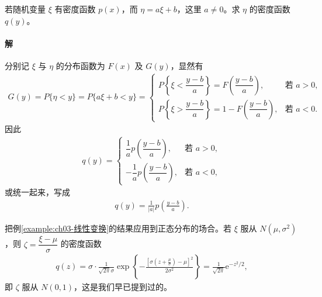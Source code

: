 \documentclass[../../main.tex]{subfiles}
\begin{document}
\begin{example}[线性变换]\label{example:ch03-线性变换}
若随机变量 $\xi$ 有密度函数 $p(x)$，而 $\eta=a\xi+b$，这里 $a\neq 0$。求 $\eta$ 的密度函数 $q(y)$。

\paragraph*{解}分别记 $\xi$ 与 $\eta$ 的分布函数为 $F(x)$ 及 $G(y)$，显然有
\begin{align*}
G(y)=P\{\eta<y\}=P\{a\xi+b<y\}=
\begin{cases}
P\left\{\xi<\dfrac{y-b}{a}\right\}=F\left(\dfrac{y-b}{a}\right), & \text{若 }a>0,\\[4pt]
P\left\{\xi>\dfrac{y-b}{a}\right\}=1-F\left(\dfrac{y-b}{a}\right), & \text{若 }a<0.
\end{cases}
\end{align*}
因此
\begin{align*}q(y)=
\begin{cases}
\dfrac{1}{a}p\left(\dfrac{y-b}{a}\right), & \text{若 }a>0,\\[4pt]
-\dfrac{1}{a}p\left(\dfrac{y-b}{a}\right), & \text{若 }a<0,
\end{cases}\end{align*}
或统一起来，写成
\begin{align}
q(y)=\frac{1}{|a|}p\left(\frac{y-b}{a}\right).\label{align:ch03-线性变换密度}
\end{align}

把例\ref{example:ch03-线性变换}的结果应用到正态分布的场合。若 $\xi$ 服从 $N(\mu,\sigma^{2})$，则 $\zeta=\dfrac{\xi-\mu}{\sigma}$ 的密度函数
\begin{align*}q(z)=\sigma\cdot\frac{1}{\sqrt{2\pi}\sigma}\exp\left\{-\frac{\left[\sigma\left(z+\frac{\mu}{\sigma}\right)-\mu\right]^{2}}{2\sigma^{2}}\right\}=\frac{1}{\sqrt{2\pi}}\mathrm{e}^{-z^{2}/2},\end{align*}
即 $\zeta$ 服从 $N(0,1)$，这是我们早已提到过的。
\end{example}
\end{document}
